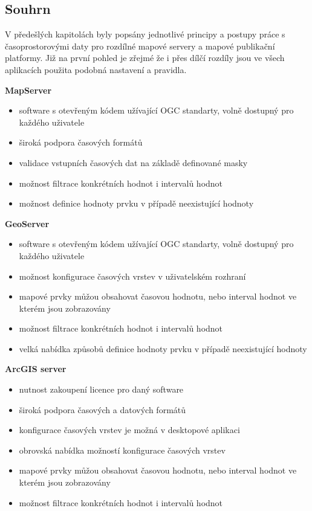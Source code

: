 \newpage
\subsection{Souhrn} V předešlých kapitolách byly popsány jednotlivé
principy a postupy práce s časoprostorovými daty pro rozdílné mapové
servery a mapové publikační platformy. Již na první pohled je zřejmé
že i přes dílčí rozdíly jsou ve všech aplikacích použita podobná
nastavení a pravidla.

\bigskip
\noindent \textbf{MapServer}
\begin{itemize}
	\item software s otevřeným kódem užívající OGC standarty,
volně dostupný pro každého uživatele
	\item široká podpora časových formátů
	\item validace vstupních časových dat na základě definované
masky
	\item možnost filtrace konkrétních hodnot i intervalů hodnot
	\item možnost definice hodnoty prvku v případě neexistující
hodnoty
\end{itemize}

\textbf{GeoServer}
\begin{itemize}
	\item software s otevřeným kódem užívající OGC standarty,
volně dostupný pro každého uživatele
	\item možnost konfigurace časových vrstev v uživatelském
rozhraní
	\item mapové prvky můžou obsahovat časovou hodnotu, nebo
interval hodnot ve kterém jsou zobrazovány
	\item možnost filtrace konkrétních hodnot i intervalů hodnot
	\item velká nabídka způsobů definice hodnoty prvku v případě
neexistující hodnoty
\end{itemize}

\textbf{ArcGIS server}
\begin{itemize}
	\item nutnost zakoupení licence pro daný software
	\item široká podpora časových a datových formátů
	\item konfigurace časových vrstev je možná v desktopové
aplikaci
	\item obrovská nabídka možností konfigurace časových vrstev
	\item mapové prvky můžou obsahovat časovou hodnotu, nebo
interval hodnot ve kterém jsou zobrazovány
	\item možnost filtrace konkrétních hodnot i intervalů hodnot
\end{itemize}


